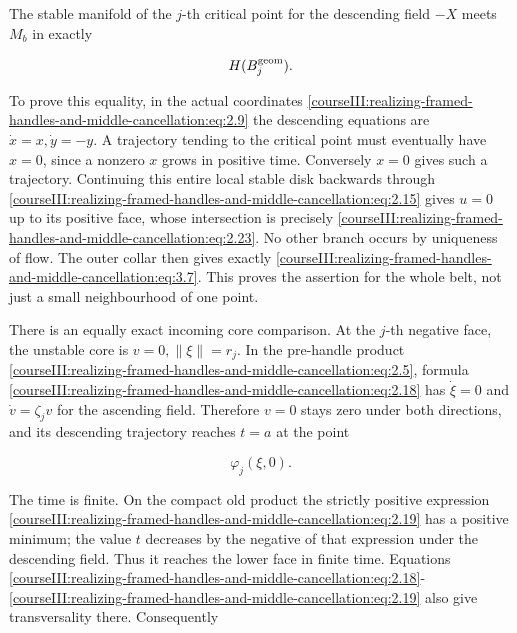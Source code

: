 The stable manifold of the \(j\)-th critical point for the descending field \(-X\) meets \(M_b\) in exactly

\begin{equation}
H(B_j^{\rm geom}).
 \label{courseIII:realizing-framed-handles-and-middle-cancellation:eq:3.7}
\end{equation}

To prove this equality, in the actual coordinates \eqref{courseIII:realizing-framed-handles-and-middle-cancellation:eq:2.9} the descending equations are \(\dot x=x,\dot y=-y\). A trajectory tending to the critical point must eventually have \(x=0\), since a nonzero \(x\) grows in positive time. Conversely \(x=0\) gives such a trajectory. Continuing this entire local stable disk backwards through \eqref{courseIII:realizing-framed-handles-and-middle-cancellation:eq:2.15} gives \(u=0\) up to its positive face, whose intersection is precisely \eqref{courseIII:realizing-framed-handles-and-middle-cancellation:eq:2.23}. No other branch occurs by uniqueness of flow. The outer collar then gives exactly \eqref{courseIII:realizing-framed-handles-and-middle-cancellation:eq:3.7}. This proves the assertion for the whole belt, not just a small neighbourhood of one point.

There is an equally exact incoming core comparison. At the \(j\)-th negative face, the unstable core is \(v=0,\|\xi\|=r_j\). In the pre-handle product \eqref{courseIII:realizing-framed-handles-and-middle-cancellation:eq:2.5}, formula \eqref{courseIII:realizing-framed-handles-and-middle-cancellation:eq:2.18} has \(\dot \xi=0\) and \(\dot v=\zeta_j v\) for the ascending field. Therefore \(v=0\) stays zero under both directions, and its descending trajectory reaches \(t=a\) at the point

\begin{equation}
\varphi_j(\xi,0).
 \label{courseIII:realizing-framed-handles-and-middle-cancellation:eq:3.8}
\end{equation}

The time is finite. On the compact old product the strictly positive expression \eqref{courseIII:realizing-framed-handles-and-middle-cancellation:eq:2.19} has a positive minimum; the value \(t\) decreases by the negative of that expression under the descending field. Thus it reaches the lower face in finite time. Equations \eqref{courseIII:realizing-framed-handles-and-middle-cancellation:eq:2.18}-\eqref{courseIII:realizing-framed-handles-and-middle-cancellation:eq:2.19} also give transversality there. Consequently


